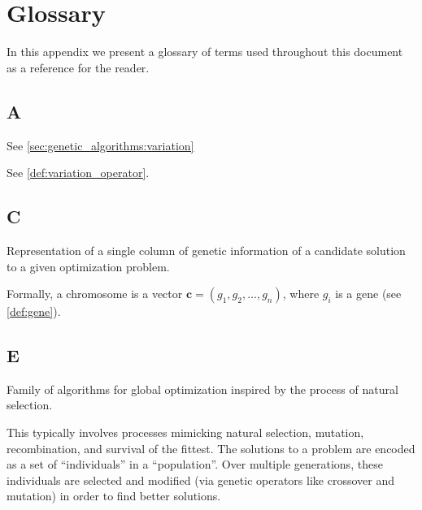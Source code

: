 \chapter{Glossary}
\label{appendix:glossary}
  In this appendix we present a glossary of terms used throughout this document as a reference for
  the reader.

  \section*{A}
    \begin{Definition}[Alteration]
    \label{def:alteration}
      See \vref{sec:genetic_algorithms:variation}
    \end{Definition}

    \begin{Definition}[Alterer]
    \label{def:alterer}
      See \vref{def:variation_operator}.
    \end{Definition}

  \section*{C}
    \begin{Definition}[Chromosome]
    \label{def:chromosome}
      Representation of a single column of genetic information of a candidate solution to a given
      optimization problem.

      Formally, a chromosome is a vector \(\textbf{c} = (g_1, g_2, \dots, g_n)\), where \(g_i\) is a
      gene (see \vref{def:gene}).
    \end{Definition}

  \section*{E}
    \begin{Definition}
    \label{def:evolutionary_computation}
      Family of algorithms for global optimization inspired by the process of natural selection.

      This typically involves processes mimicking natural selection, mutation, recombination, and 
      survival of the fittest. 
      The solutions to a problem are encoded as a set of \enquote{individuals} in a 
      \enquote{population}. 
      Over multiple generations, these individuals are selected and modified (via genetic operators 
      like crossover and mutation) in order to find better solutions.
    \end{Definition}
    
